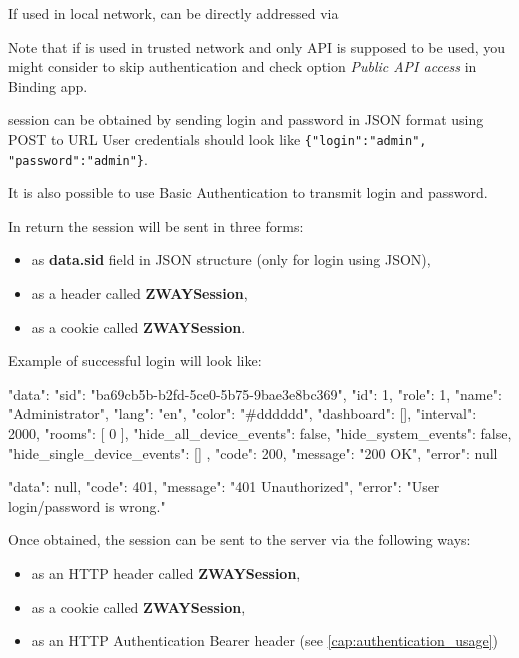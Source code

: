 If used in local network, \zway can be directly addressed via 

Note that if \zway is used in trusted network and only \zwave API is supposed to be used, you might consider to skip authentication and check option \textit{Public API access} in \zwave Binding app.

\zway session can be obtained by sending login and password
in JSON format using POST to URL 
User credentials should look like \texttt{\{"login":"admin", "password":"admin"\}}.

It is also possible to use Basic Authentication to transmit login and password.

In return the session will be sent in three forms:
\begin{itemize}
\item as \textbf{data.sid} field in JSON structure (only for login using JSON),
\item as a header called \textbf{ZWAYSession},
\item as a cookie called \textbf{ZWAYSession}.
\end{itemize}

Example of successful login will look like:
\begin{listingverbatim}
{
    "data": {
        "sid": "ba69cb5b-b2fd-5ce0-5b75-9bae3e8bc369",
        "id": 1,
        "role": 1,
        "name": "Administrator",
        "lang": "en",
        "color": "#dddddd",
        "dashboard": [],
        "interval": 2000,
        "rooms": [
            0
        ],
        "hide_all_device_events": false,
        "hide_system_events": false,
        "hide_single_device_events": []
    },
    "code": 200,
    "message": "200 OK",
    "error": null
}
\end{listingverbatim}

\begin{listingverbatim}
{
    "data": null,
    "code": 401,
    "message": "401 Unauthorized",
    "error": "User login/password is wrong."
}
\end{listingverbatim}

Once obtained, the session can be sent to the \zway server via the following ways:
\begin{itemize}
\item as an HTTP header called \textbf{ZWAYSession},
\item as a cookie called \textbf{ZWAYSession},
\item as an HTTP Authentication Bearer header (see \ref{cap:authentication_usage})
\end{itemize}

